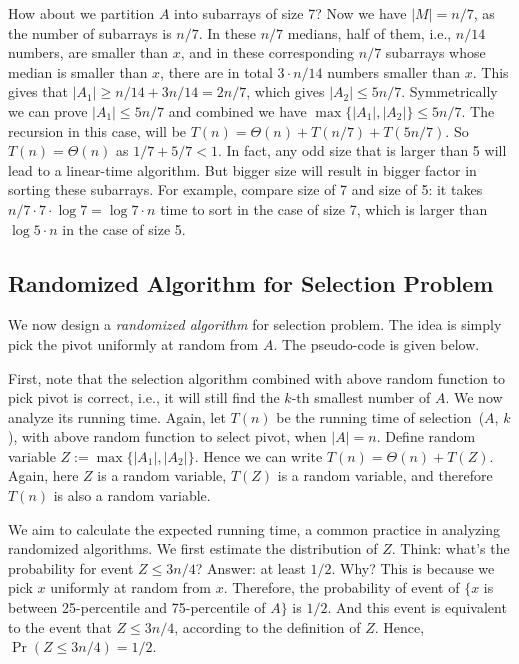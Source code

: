 How about we partition $A$ into subarrays of size 7?
Now we have $|M| = n/7$, as the number of subarrays is $n/7$.
In these $n/7$ medians, half of them, i.e., $n/14$ numbers, are smaller than $x$,
and in these corresponding $n/7$ subarrays whose median is smaller than $x$, there are in total $3\cdot n/14$ numbers smaller than $x$.
This gives that $|A_1| \ge n/14 + 3n/14 = 2n/7$, which gives $|A_2| \le 5n/7$. Symmetrically we can prove $|A_1| \le 5n/7$ and combined we have 
$\max\{|A_1|, |A_2|\} \le 5n/7$.
The recursion in this case, will be $T(n) = \Theta(n) + T(n/7) + T(5n/7)$.
So $T(n) = \Theta(n)$ as $1/7 + 5/7 < 1$. 
In fact, any odd size that is larger than 5 will lead to a linear-time algorithm.
But bigger size will result in bigger factor in sorting these subarrays. 
For example, compare size of 7 and size of 5: it takes $n/7 \cdot 7 \cdot \log 7 = \log 7 \cdot n$ time to sort in the case of size 7,
which is larger than $\log 5 \cdot n$ in the case of size 5.

\subsection*{Randomized Algorithm for Selection Problem}

We now design a \emph{randomized algorithm} for selection problem.
The idea is simply pick the pivot uniformly at random from $A$.
The pseudo-code is given below.

\begin{minipage}{0.8\textwidth}
	\xxx
	\xxx
	\xxx
\end{minipage}

First, note that the selection algorithm combined with above random function to pick pivot is correct, i.e., it will still find the
$k$-th smallest number of $A$.
We now analyze its running time. 
Again, let $T(n)$ be the running time of selection~($A$, $k$), with above random function to select pivot, when $|A| = n$. 
Define random variable $Z := \max\{|A_1|, |A_2|\}$.
Hence we can write $T(n) = \Theta(n) + T(Z)$.
Again, here $Z$ is a random variable, $T(Z)$ is a random variable, and therefore $T(n)$ is also a random variable.

We aim to calculate the expected running time, a common practice in analyzing randomized algorithms.
We first estimate the distribution of $Z$.
Think: what's the probability for event $Z \le 3n/4$?
Answer: at least $1/2$. Why? This is because we pick $x$ uniformly at random from $x$.
Therefore, the probability of event of $\{x$ is between 25-percentile and 75-percentile of $A\}$ is $1/2$.
And this event is equivalent to the event that $Z \le 3n/4$, according to the definition of $Z$.
Hence, $\Pr(Z \le 3n/4) = 1/2$.

